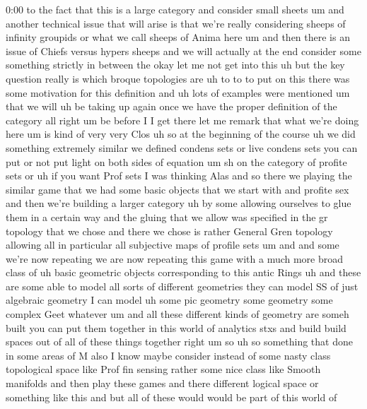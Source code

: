 \begin{unfinished}{0:00}
to  the  fact  that  this  is  a  large
category
and  consider  small  sheets  um  and  another
technical  issue  that  will  arise  is  that
we're  really  considering  sheeps  of
infinity  groupids  or  what  we  call  sheeps
of  Anima  here  um  and  then  there  is  an
issue  of  Chiefs  versus  hypers  sheeps  and
we  will  actually  at  the  end  consider
some  something  strictly  in  between  the
okay  let  me  not  get  into  this  uh  but  the
key  question  really  is  which  broque
topologies  are  uh  to  to  to  put  on
this  there  was  some  motivation  for  this
definition  and  uh  lots  of  examples  were
mentioned  um  that  we  will  uh  be  taking
up  again  once  we  have  the  proper
definition  of  the
category  all  right
um  be  before  I  I  get  there  let  me  remark
that  what  we're  doing
here  um  is  kind  of  very  very  Clos  uh  so
at  the  beginning  of  the  course
uh  we  did  something  extremely
similar  we  defined  condens  sets  or  live
condens  sets
you  can  put  or  not  put  light  on  both
sides  of  equation  um  sh  on  the  category
of  profite
sets  or  uh  if  you  want  Prof  sets  I  was
thinking
Alas  and  so  there  we  playing  the  similar
game  that  we  had  some  basic  objects  that
we  start  with  and  profite  sex  and  then
we're  building  a  larger  category  uh  by
some  allowing  ourselves  to  glue  them  in
a  certain  way  and  the  gluing  that  we
allow  was  specified  in  the  gr  topology
that  we  chose  and  there  we  chose  is
rather  General  Gren  topology  allowing
all  in  particular  all  subjective  maps  of
profile  sets  um  and  and  some  we're  now
repeating  we  are  now  repeating  this  game
with  a  much  more  broad  class  of  uh  basic
geometric  objects  corresponding  to  this
antic  Rings  uh  and  these  are  some  able
to  model  all  sorts  of  different
geometries  they  can  model  SS  of
just  algebraic  geometry  I  can
model  uh  some  pic  geometry  some  geometry
some  complex  Geet  whatever  um  and  all
these  different  kinds  of  geometry  are
someh
built  you  can  put  them  together  in  this
world  of  analytics  stxs  and  build  build
spaces  out  of  all  of  these  things
together  right  um
so  uh  so  something  that  done  in  some
areas  of  M  also  I  know  maybe  consider
instead  of  some  nasty  class  topological
space  like  Prof  fin  sensing  rather  some
nice  class  like  Smooth  manifolds  and
then  play  these  games
and  there  different  logical  space  or
something  like  this  and  but  all  of  these
would  would  be  part  of  this  world  of

\end{unfinished}
